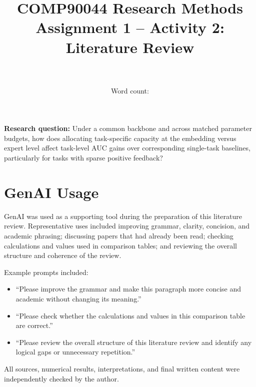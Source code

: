 \documentclass[11pt,a4paper]{article}
\title{
  \vspace{-2.2em}
  {\large\textbf{COMP90044 Research Methods}}\\[0.3em]
  {\normalsize Assignment 1 -- Activity 2: Literature Review}\\[0.5em]
  {\LARGE\textbf{\researchtopic}}\\[0.2em]
}
\author{\studentname\quad\studentid}
\date{Word count: \wordcount}
\newcommand{\researchquestion}
{Under a common backbone and across matched parameter budgets, how does allocating task-specific capacity at the embedding versus expert level affect task-level AUC gains over corresponding single-task baselines, particularly for tasks with sparse positive feedback?}
\begin{document}
\maketitle

\vspace{-1.5em}
\begin{center}
\parbox{0.92\textwidth}{
  \small
  \textbf{Research question:} \researchquestion
}
\end{center}
\vspace{0.5em}









\newpage



\newpage
\appendix
\section{GenAI Usage}

GenAI was used as a supporting tool during the preparation of this literature review. Representative uses included improving grammar, clarity, concision, and academic phrasing; discussing papers that had already been read; checking calculations and values used in comparison tables; and reviewing the overall structure and coherence of the review.

Example prompts included:
\begin{itemize}
    \item ``Please improve the grammar and make this paragraph more concise and academic without changing its meaning.''
    \item ``Please check whether the calculations and values in this comparison table are correct.''
    \item ``Please review the overall structure of this literature review and identify any logical gaps or unnecessary repetition.''
\end{itemize}

All sources, numerical results, interpretations, and final written content were independently checked by the author.
\end{document}
